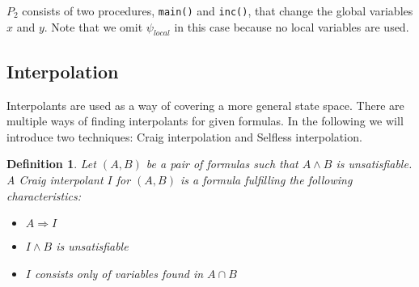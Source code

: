 \documentclass{article}
\newtheorem{mydef}{Definition}
\newcommand\mycom[1]{}
\newcommand\mycom[1]{#1}
\newcommand{\jw}[1]{\mycom{\todo[color=blue!40,inline]{\small JW: #1}}}
\begin{document}
\begin{minipage}{.6\textwidth}
		\label{fig:rect}
	\end{minipage}%
	
	\pagebreak
	$P_2$ consists of two procedures, \texttt{main()} and \texttt{inc()}, that change the global variables $x$ and $y$. Note that we omit $\psi_{local}$ in this case because no local variables are used.
	\jw{more details + example with local vars.}
	
	
	\pagebreak
	
	
	\subsection{Interpolation}
	Interpolants are used as a way of covering a more general state space. There are multiple ways of finding interpolants for given formulas.
	In the following we will introduce two techniques: Craig interpolation and Selfless interpolation. 
	\jw{citation needed}
	
	\begin{mydef}
		Let $(A, B)$ be a pair of formulas such that $A \land B$ is unsatisfiable. A Craig interpolant $I$ for $(A, B)$ is a formula fulfilling the following characteristics:
		\begin{itemize}
			\item $A \Rightarrow I$
			\item $I \land B$ is unsatisfiable
			\item $I$ consists only of variables found in $A \cap B$
		\end{itemize}
	\end{mydef}
\end{document}
